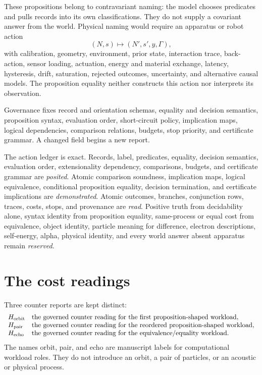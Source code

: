 These propositions belong to contravariant naming: the model chooses predicates and pulls records into its own
classifications.  They do not supply a covariant answer from the world.  Physical naming would require an apparatus
or robot action
\[
                         (N,s)\longmapsto(N',s',y,\Gamma),
\]
with calibration, geometry, environment, prior state, interaction trace, back-action, sensor loading, actuation,
energy and material exchange, latency, hysteresis, drift, saturation, rejected outcomes, uncertainty, and alternative
causal models.  The proposition equality neither constructs this action nor interprets its observation.

Governance fixes record and orientation schemas, equality and decision semantics, proposition syntax, evaluation
order, short-circuit policy, implication maps, logical dependencies, comparison relations, budgets, stop priority,
and certificate grammar.  A changed field begins a new report.

The action ledger is exact.  Records, label, predicates, equality, decision semantics, evaluation order,
extensionality dependency, comparisons, budgets, and certificate grammar are \emph{posited}.  Atomic comparison
soundness, implication maps, logical equivalence, conditional proposition equality, decision termination, and
certificate implications are \emph{demonstrated}.  Atomic outcomes, branches, conjunction rows, traces, costs, stops,
and provenance are \emph{read}.  Positive truth from decidability alone, syntax identity from proposition equality,
same-process or equal cost from equivalence, object identity, particle meaning for difference, electron descriptions,
self-energy, alpha, physical identity, and every world answer absent apparatus remain \emph{reserved}.
\section{The cost readings}

Three counter reports are kept distinct:
\[
\begin{array}{ll}
H_{\rm orbit}&\text{the governed counter reading for the first proposition-shaped workload},\\
H_{\rm pair}&\text{the governed counter reading for the reordered proposition-shaped workload},\\
H_{\rm echo}&\text{the governed counter reading for the equivalence/equality workload}.
\end{array}
\]
The names orbit, pair, and echo are manuscript labels for computational workload roles.  They do not introduce an
orbit, a pair of particles, or an acoustic or physical process.

